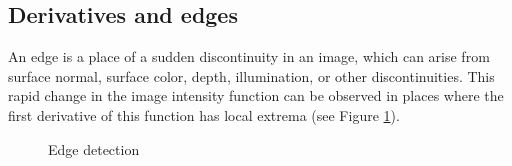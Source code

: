 \subsection{Derivatives and edges}
An edge is a place of a sudden discontinuity in an image, which can arise from surface normal, surface color, depth, illumination, or other discontinuities. This rapid change in the image intensity function can be observed in places where the first derivative of this function has local extrema (see Figure \ref{fig:edge-detection}).\cite{edge-detection}
\begin{figure}[H]
     \centering
     \vfill
     \vfill
     \caption{Edge detection}
     \label{fig:edge-detection}
\end{figure}

